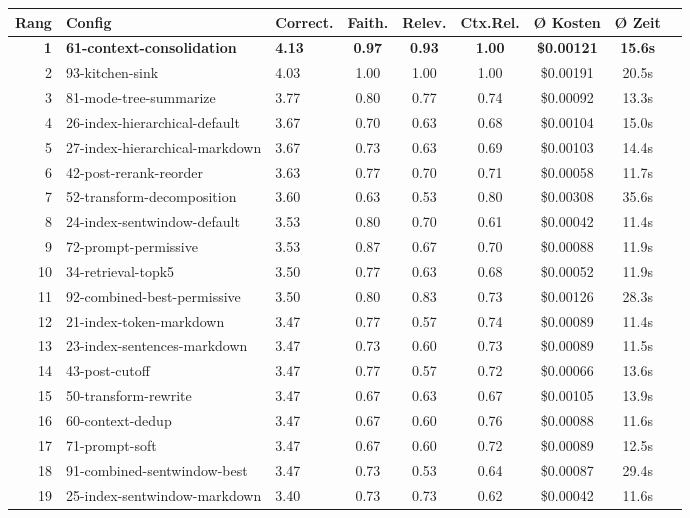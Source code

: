 \begin{table}[H]
\centering
\small
\begin{tabular}{rllcccccc}
\toprule
Rang & Config & Correct. & Faith. & Relev. & Ctx.Rel. & Ø Kosten & Ø Zeit \\
\midrule
\textbf{1} & \textbf{61-context-consolidation} & \textbf{4.13} & \textbf{0.97} & \textbf{0.93} & \textbf{1.00} & \textbf{\$0.00121} & \textbf{15.6s} \\
2 & 93-kitchen-sink & 4.03 & 1.00 & 1.00 & 1.00 & \$0.00191 & 20.5s \\
3 & 81-mode-tree-summarize & 3.77 & 0.80 & 0.77 & 0.74 & \$0.00092 & 13.3s \\
4 & 26-index-hierarchical-default & 3.67 & 0.70 & 0.63 & 0.68 & \$0.00104 & 15.0s \\
5 & 27-index-hierarchical-markdown & 3.67 & 0.73 & 0.63 & 0.69 & \$0.00103 & 14.4s \\
6 & 42-post-rerank-reorder & 3.63 & 0.77 & 0.70 & 0.71 & \$0.00058 & 11.7s \\
7 & 52-transform-decomposition & 3.60 & 0.63 & 0.53 & 0.80 & \$0.00308 & 35.6s \\
8 & 24-index-sentwindow-default & 3.53 & 0.80 & 0.70 & 0.61 & \$0.00042 & 11.4s \\
9 & 72-prompt-permissive & 3.53 & 0.87 & 0.67 & 0.70 & \$0.00088 & 11.9s \\
10 & 34-retrieval-topk5 & 3.50 & 0.77 & 0.63 & 0.68 & \$0.00052 & 11.9s \\
11 & 92-combined-best-permissive & 3.50 & 0.80 & 0.83 & 0.73 & \$0.00126 & 28.3s \\
12 & 21-index-token-markdown & 3.47 & 0.77 & 0.57 & 0.74 & \$0.00089 & 11.4s \\
13 & 23-index-sentences-markdown & 3.47 & 0.73 & 0.60 & 0.73 & \$0.00089 & 11.5s \\
14 & 43-post-cutoff & 3.47 & 0.77 & 0.57 & 0.72 & \$0.00066 & 13.6s \\
15 & 50-transform-rewrite & 3.47 & 0.67 & 0.63 & 0.67 & \$0.00105 & 13.9s \\
16 & 60-context-dedup & 3.47 & 0.67 & 0.60 & 0.76 & \$0.00088 & 11.6s \\
17 & 71-prompt-soft & 3.47 & 0.67 & 0.60 & 0.72 & \$0.00089 & 12.5s \\
18 & 91-combined-sentwindow-best & 3.47 & 0.73 & 0.53 & 0.64 & \$0.00087 & 29.4s \\
19 & 25-index-sentwindow-markdown & 3.40 & 0.73 & 0.73 & 0.62 & \$0.00042 & 11.6s \\

\end{tabular}
\end{table}
